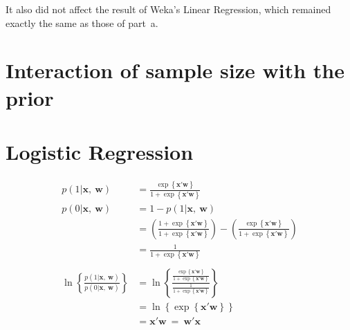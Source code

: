 \documentclass{article}
\begin{document}
It also did not affect the result of Weka's Linear Regression, which remained exactly the same as those of \mbox{part a}. 

\section{Interaction of sample size with the prior}

\section{Logistic Regression}
\begin{align*}
p(1|\bm{x},~\bm{w}) &= \frac{ \exp\left\{ \bm{x}'\bm{w} \right\} }{ 1+\exp\left\{ \bm{x}'\bm{w} \right\} }\\
p(0|\bm{x},~\bm{w}) &= 1-p(1|\bm{x},~\bm{w})\\
		    &= \left(\frac{1+ \exp\left\{ \bm{x}'\bm{w} \right\} }{ 1+\exp\left\{ \bm{x}'\bm{w} \right\} }\right)-\left(\frac{ \exp\left\{ \bm{x}'\bm{w} \right\} }{ 1+\exp\left\{ \bm{x}'\bm{w} \right\} }\right)\\
		    &= \frac{ 1 }{ 1+\exp\left\{ \bm{x}'\bm{w} \right\} }\\
		    &\nonumber\\
\ln\left\{ \frac{p(1|\bm{x},~\bm{w})}{p(0|\bm{x},~\bm{w})} \right\} &= \ln \left\{ 
	\frac{ \frac{ \exp\left\{ \bm{x}'\bm{w} \right\} }{ 1+\exp\left\{ \bm{x}'\bm{w} \right\} } }
	     { \frac{ 1 }{ 1+\exp\left\{ \bm{x}'\bm{w} \right\} } } 
	\right\}\\
		    &= \ln\left\{ \exp\left\{ \bm{x}'\bm{w} \right\} \right\}\\
		    &= \bm{x}'\bm{w}~=~\bm{w}'\bm{x}
\end{align*}
\end{document}
